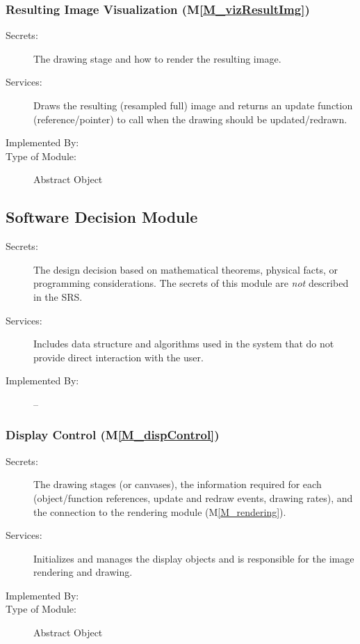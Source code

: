 \documentclass[12pt, titlepage]{article}
\newcommand{\mref}[1]{M\ref{#1}}
\begin{document}
\subsubsection{Resulting Image Visualization (\mref{M_vizResultImg})}
\begin{description}
\item[Secrets:] The drawing stage and how to render the resulting image.
\item[Services:] Draws the resulting (resampled full) image 
  and returns an update function (reference/pointer) to call when the drawing
  should be updated/redrawn.
\item[Implemented By:] \progname{}
\item[Type of Module:] Abstract Object
\end{description}



\subsection{Software Decision Module}

\begin{description}
\item[Secrets:] The design decision based on mathematical theorems, physical
  facts, or programming considerations. The secrets of this module are
  \emph{not} described in the SRS.
\item[Services:] Includes data structure and algorithms used in the system that
  do not provide direct interaction with the user. 
\item[Implemented By:] --
\end{description}


\subsubsection{Display Control (\mref{M_dispControl})}
\begin{description}
\item[Secrets:] The drawing stages (or canvases), the information required
  for each (object/function references, update and redraw events, drawing rates),
  and the connection to the rendering module (\mref{M_rendering}).
\item[Services:] Initializes and manages the display objects and is responsible
  for the image rendering and drawing.
\item[Implemented By:] \progname{}
\item[Type of Module:] Abstract Object
\end{description}
\end{document}

